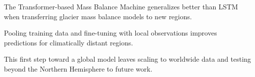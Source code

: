 \documentclass[draft]{agujournal2019}
\begin{document}








\begin{keypoints}
\item The Transformer-based Mass Balance Machine generalizes better than LSTM when transferring glacier mass balance models to new regions.
\item Pooling training data and fine-tuning with local observations improves predictions for climatically distant regions.
\item  This first step toward a global model leaves scaling to worldwide data and testing beyond the Northern Hemisphere to future work.
\end{keypoints}


%
%

%
%
\end{document}
